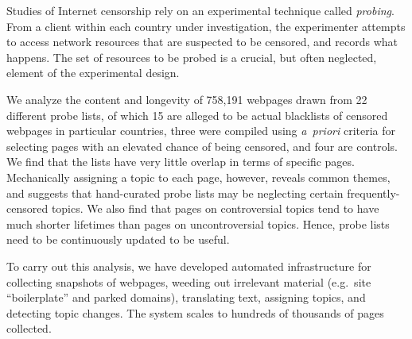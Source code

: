 Studies of Internet censorship rely on an experimental technique
called \textit{probing}.  From a client within each country under
investigation, the experimenter attempts to access network resources
that are suspected to be censored, and records what happens.  The set
of resources to be probed is a crucial, but often neglected, element of the
experimental design.

We analyze the content and longevity of 758,191 webpages drawn from 22
different probe lists, of which 15 are alleged to be actual blacklists
of censored webpages in particular countries, three were compiled using
\emph{a~priori} criteria for selecting pages with an elevated chance
of being censored, and four are controls.  We find that the lists have
very little overlap in terms of specific pages.  Mechanically
assigning a topic to each page, however, reveals common themes, and
suggests that hand-curated probe lists may be neglecting certain
frequently-censored topics.  We also find that pages on controversial
topics tend to have much shorter lifetimes than pages on
uncontroversial topics.  Hence, probe lists need to be continuously
updated to be useful.

To carry out this analysis, we have developed automated infrastructure
for collecting snapshots of webpages, weeding out irrelevant material
(e.g.\ site “boilerplate” and parked domains), translating text,
assigning topics, and detecting topic changes.  The system scales to
hundreds of thousands of pages collected.
